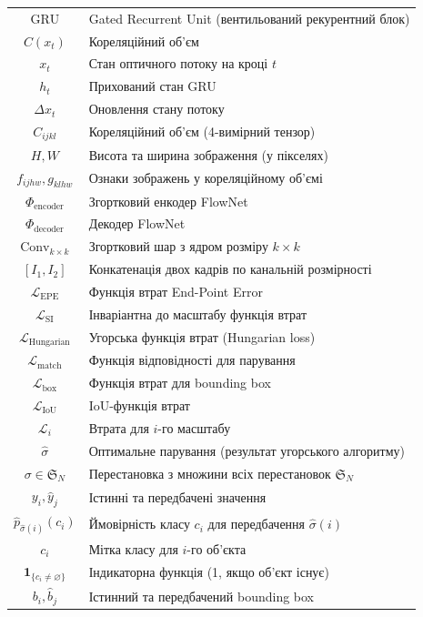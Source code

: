 \documentclass[14pt, a4paper]{extarticle}
\numberwithin{equation}{section}
\begin{document}
\begin{longtable}{|c|l|}
$\text{GRU}$ & Gated Recurrent Unit (вентильований рекурентний блок) \\
$C(x_t)$ & Кореляційний об'єм \\
$x_t$ & Стан оптичного потоку на кроці $t$ \\
$h_t$ & Прихований стан GRU \\
$\Delta x_t$ & Оновлення стану потоку \\
$C_{ijkl}$ & Кореляційний об'єм (4-вимірний тензор) \\
$H, W$ & Висота та ширина зображення (у пікселях) \\
$f_{ijhw}, g_{klhw}$ & Ознаки зображень у кореляційному об'ємі \\
$\Phi_{\text{encoder}}$ & Згортковий енкодер FlowNet \\
$\Phi_{\text{decoder}}$ & Декодер FlowNet \\
$\text{Conv}_{k \times k}$ & Згортковий шар з ядром розміру $k \times k$ \\
$[I_1, I_2]$ & Конкатенація двох кадрів по канальній розмірності \\
$\mathcal{L}_{\text{EPE}}$ & Функція втрат End-Point Error \\
$\mathcal{L}_{\text{SI}}$ & Інваріантна до масштабу функція втрат \\
$\mathcal{L}_{\text{Hungarian}}$ & Угорська функція втрат (Hungarian loss) \\
$\mathcal{L}_{\text{match}}$ & Функція відповідності для парування \\
$\mathcal{L}_{\text{box}}$ & Функція втрат для bounding box \\
$\mathcal{L}_{\text{IoU}}$ & IoU-функція втрат \\
$\mathcal{L}_i$ & Втрата для $i$-го масштабу \\
$\hat{\sigma}$ & Оптимальне парування (результат угорського алгоритму) \\
$\sigma \in \mathfrak{S}_N$ & Перестановка з множини всіх перестановок $\mathfrak{S}_N$ \\
$y_i, \hat{y}_j$ & Істинні та передбачені значення \\
$\hat{p}_{\hat{\sigma}(i)}(c_i)$ & Ймовірність класу $c_i$ для передбачення $\hat{\sigma}(i)$ \\
$c_i$ & Мітка класу для $i$-го об'єкта \\
$\mathbf{1}_{\{c_i \neq \varnothing\}}$ & Індикаторна функція (1, якщо об'єкт існує) \\
$b_i, \hat{b}_j$ & Істинний та передбачений bounding box \\

\end{longtable}
\end{document}
